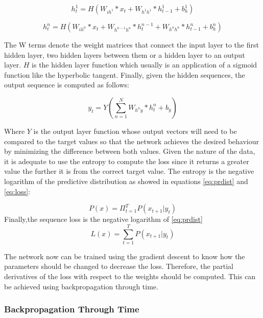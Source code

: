 \begin{equation} \label{eq:hidden1}
h_t^1= H( W_{ih^1} * x_t + W_{h^1 h^1}*h^1_{t-1} + b^1_h)
\end{equation}

\begin{equation} \label{eq:hidden}
h_t^n= H(W_{ih^n} * x_t + W_{h^{n-1}  h^n} * h^{n-1}_t +W_{h^n h^n} * h^n_{t-1}+ b^n_h)
\end{equation}

The W terms denote the weight matrices that connect the input layer to the first hidden layer, two hidden layers between them or a hidden layer to an output layer. $H$ is the hidden layer function which usually is an application of a sigmoid function like the hyperbolic tangent. Finally, given the hidden sequences, the output sequence is computed as follows:

\begin{equation} \label{eq:output}
y_t=Y(\sum_{n=1}^{N} W_{h^{n}y} * h^n_t + b_y)
\end{equation}

Where $Y$ is the output layer function whose output vectors will need to be compared to the target values so that the network achieves the desired behaviour by minimizing the difference between both values.
Given the nature of the data, it is adequate to use the entropy to compute the loss since it returns a greater value the further it is from the correct target  value. The entropy is the negative logarithm of the predictive distribution as showed in equations \ref{eq:prdist} and \ref{eq:loss}:

\begin{equation} \label{eq:prdist}
P(x)=\Pi_{t=1}^{T} P(x_{t+1}|y_t)
\end{equation}
Finally,the sequence loss is the negative logarithm of \ref{eq:prdist}
\begin{equation} \label{eq:loss}
L(x)=\sum_{t=1}^{T} P(x_{t+1}|y_t)
\end{equation}

The network now can be trained using the gradient descent to know how the parameters should be changed to decrease the loss. Therefore, the partial derivatives of the loss with respect to the weights should be computed. This can be achieved using backpropagation through time.


\subsubsection{Backpropagation Through Time}

